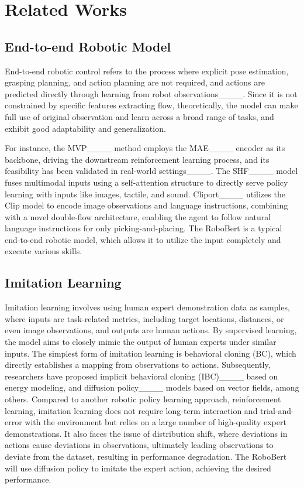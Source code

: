 \section{Related Works}
\subsection{End-to-end Robotic Model}
End-to-end robotic control refers to the process where explicit pose estimation, grasping planning, and action planning are not required, and actions are predicted directly through learning from robot observations____. Since it is not constrained by specific features extracting flow, theoretically, the model can make full use of original observation and learn across a broad range of tasks, and exhibit good adaptability and generalization. 

For instance, the MVP____ method employs the MAE____ encoder as its backbone, driving the downstream reinforcement learning process, and its feasibility has been validated in real-world settings____. The SHF____ model fuses multimodal inputs using a self-attention structure to directly serve policy learning with inputs like images, tactile, and sound. Cliport____ utilizes the Clip model to encode image observations and language instructions, combining with a novel double-flow architecture, enabling the agent to follow natural language instructions for only picking-and-placing. The RoboBert is a typical end-to-end robotic model, which allows it to utilize the input completely and execute various skills.

\subsection{Imitation Learning}
Imitation learning involves using human expert demonstration data as samples, where inputs are task-related metrics, including target locations, distances, or even image observations, and outputs are human actions. By supervised learning, the model aims to closely mimic the output of human experts under similar inputs. The simplest form of imitation learning is behavioral cloning (BC), which directly establishes a mapping from observations to actions. Subsequently, researchers have proposed implicit behavioral cloning (IBC)____ based on energy modeling, and diffusion policy____ models based on vector fields, among others. Compared to another robotic policy learning approach, reinforcement learning, imitation learning does not require long-term interaction and trial-and-error with the environment but relies on a large number of high-quality expert demonstrations. It also faces the issue of distribution shift, where deviations in actions cause deviations in observations, ultimately leading observations to deviate from the dataset, resulting in performance degradation. The RoboBert will use diffusion policy to imitate the expert action, achieving the desired performance.

